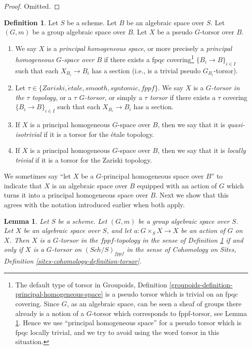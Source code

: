 \documentclass{stacks-project}
\theoremstyle{plain}
\newtheorem{lemma}[subsection]{Lemma}
\theoremstyle{definition}
\newtheorem{definition}[subsection]{Definition}
\theoremstyle{remark}
\numberwithin{equation}{subsection}
\def\Sch{\mathit{Sch}}
\def\etale{{\acute{e}tale}}
\begin{document}
\begin{proof}
Omitted.
\end{proof}

\begin{definition}
\label{definition-principal-homogeneous-space}
Let $S$ be a scheme.
Let $B$ be an algebraic space over $S$.
Let $(G, m)$ be a group algebraic space over $B$.
Let $X$ be a pseudo $G$-torsor over $B$.
\begin{enumerate}
\item We say $X$ is a
{\it principal homogeneous space}, or more precisely a
{\it principal homogeneous $G$-space over $B$}
if there exists a fpqc covering\footnote{The default type of torsor in
Groupoids, Definition \ref{groupoids-definition-principal-homogeneous-space}
is a pseudo torsor which is trivial on an fpqc covering.
Since $G$, as an algebraic space, can be seen a sheaf of groups
there already is a notion of a $G$-torsor which corresponds
to fppf-torsor, see
Lemma \ref{lemma-torsor}.
Hence we use ``principal homogeneous space'' for a pseudo torsor which
is fpqc locally trivial, and we try to avoid using the word torsor in
this situation.}
$\{B_i \to B\}_{i \in I}$ such that each
$X_{B_i} \to B_i$ has a section (i.e., is a trivial pseudo $G_{B_i}$-torsor).
\item Let $\tau \in \{Zariski, \etale, smooth, syntomic, fppf\}$.
We say $X$ is a {\it $G$-torsor in the $\tau$ topology}, or a
{\it $\tau$ $G$-torsor}, or simply a {\it $\tau$ torsor}
if there exists a $\tau$ covering $\{B_i \to B\}_{i \in I}$
such that each $X_{B_i} \to B_i$ has a section.
\item If $X$ is a principal homogeneous $G$-space over $B$,
then we say that it is
{\it quasi-isotrivial} if it is a torsor for the \'etale topology.
\item If $X$ is a principal homogeneous $G$-space over $B$,
then we say that it is
{\it locally trivial} if it is a torsor for the Zariski topology.
\end{enumerate}
\end{definition}

\noindent
We sometimes say ``let $X$ be a $G$-principal homogeneous space over $B$''
to indicate that $X$ is an algebraic space over $B$ equipped with an
action of $G$ which turns it into a principal homogeneous space over $B$.
Next we show that this agrees with the notation introduced earlier
when both apply.

\begin{lemma}
\label{lemma-torsor}
Let $S$ be a scheme.
Let $(G, m)$ be a group algebraic space over $S$.
Let $X$ be an algebraic space over $S$, and let
$a : G \times_S X \to X$ be an action of $G$ on $X$.
Then
$X$ is a $G$-torsor in the $fppf$-topology in the sense of
Definition \ref{definition-principal-homogeneous-space}
if and only if
$X$ is a $G$-torsor on $(\Sch/S)_{fppf}$
in the sense of
Cohomology on Sites, Definition \ref{sites-cohomology-definition-torsor}.
\end{lemma}
\end{document}
